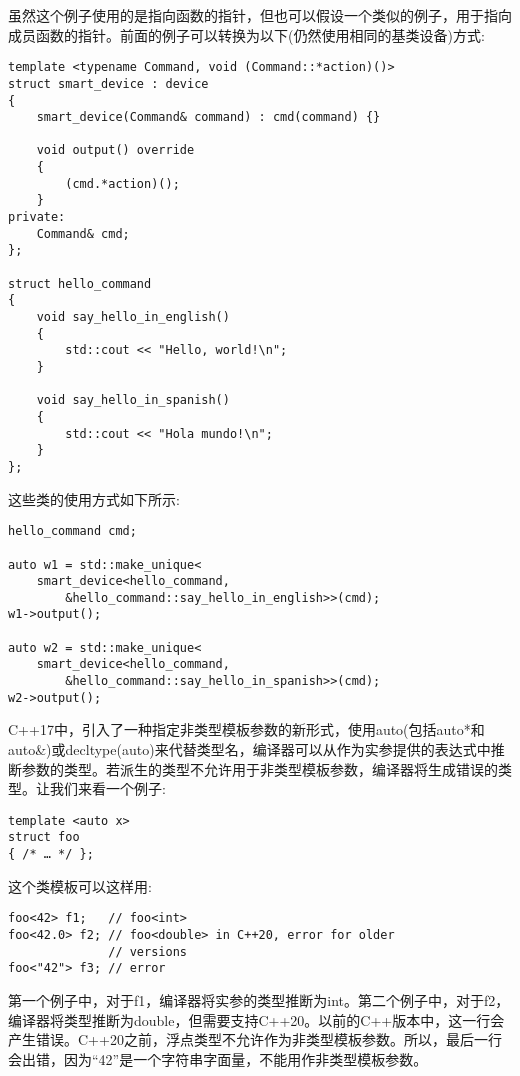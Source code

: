 虽然这个例子使用的是指向函数的指针，但也可以假设一个类似的例子，用于指向成员函数的指针。前面的例子可以转换为以下(仍然使用相同的基类设备)方式:

\begin{lstlisting}[style=styleCXX]
template <typename Command, void (Command::*action)()>
struct smart_device : device
{
	smart_device(Command& command) : cmd(command) {}
	
	void output() override
	{
		(cmd.*action)();
	}
private:
	Command& cmd;
};

struct hello_command
{
	void say_hello_in_english()
	{
		std::cout << "Hello, world!\n";
	}

	void say_hello_in_spanish()
	{
		std::cout << "Hola mundo!\n";
	}
};
\end{lstlisting}

这些类的使用方式如下所示:

\begin{lstlisting}[style=styleCXX]
hello_command cmd;

auto w1 = std::make_unique<
	smart_device<hello_command,
		&hello_command::say_hello_in_english>>(cmd);
w1->output();

auto w2 = std::make_unique<
	smart_device<hello_command,
		&hello_command::say_hello_in_spanish>>(cmd);
w2->output();
\end{lstlisting}

C++17中，引入了一种指定非类型模板参数的新形式，使用auto(包括auto*和auto\&)或decltype(auto)来代替类型名，编译器可以从作为实参提供的表达式中推断参数的类型。若派生的类型不允许用于非类型模板参数，编译器将生成错误的类型。让我们来看一个例子:

\begin{lstlisting}[style=styleCXX]
template <auto x>
struct foo
{ /* … */ };
\end{lstlisting}

这个类模板可以这样用:

\begin{lstlisting}[style=styleCXX]
foo<42> f1;   // foo<int>
foo<42.0> f2; // foo<double> in C++20, error for older
              // versions
foo<"42"> f3; // error
\end{lstlisting}

第一个例子中，对于f1，编译器将实参的类型推断为int。第二个例子中，对于f2，编译器将类型推断为double，但需要支持C++20。以前的C++版本中，这一行会产生错误。C++20之前，浮点类型不允许作为非类型模板参数。所以，最后一行会出错，因为“42”是一个字符串字面量，不能用作非类型模板参数。

